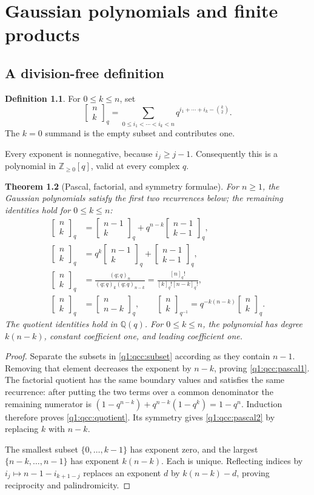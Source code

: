 \documentclass[11pt,a4paper,oneside,openany]{book}
\newtheorem{theorem}{Theorem}[chapter]
\theoremstyle{definition}
\newtheorem{definition}[theorem]{Definition}
\theoremstyle{remark}
\newcommand{\Z}{\mathbb Z}
\newcommand{\Q}{\mathbb Q}
\newcommand{\GB}[3][q]{\begin{bmatrix}#2\\#3\end{bmatrix}_{#1}}
\newcommand{\qf}[2][q]{[#2]_{#1}!}
\begin{document}
\chapter{Gaussian polynomials and finite products}
\label{q1:qcc:gaussian}
\section{A division-free definition}
\begin{definition}
For \(0\le k\le n\), set
\begin{equation}\label{q1:qcc:subset}
 \GB nk=\sum_{0\le i_1<\cdots<i_k<n}
 q^{i_1+\cdots+i_k-\binom{k}{2}}.
\end{equation}
The \(k=0\) summand is the empty subset and contributes one.
\end{definition}
Every exponent is nonnegative, because \(i_j\ge j-1\). Consequently this is a
polynomial in \(\Z_{\ge0}[q]\), valid at every complex \(q\).

\begin{theorem}[Pascal, factorial, and symmetry formulae]\label{q1:qcc:pascal}
For \(n\ge1\), the Gaussian polynomials satisfy the first two recurrences
below; the remaining identities hold for \(0\le k\le n\):
\begin{align}
 \GB nk&=\GB{n-1}k+q^{n-k}\GB{n-1}{k-1},\label{q1:qcc:pascal1}\\
 \GB nk&=q^k\GB{n-1}k+\GB{n-1}{k-1},\label{q1:qcc:pascal2}\\
 \GB nk&=\frac{(q;q)_n}{(q;q)_k(q;q)_{n-k}}
       =\frac{\qf n}{\qf k\qf{n-k}},\label{q1:qcc:quotient}\\
 \GB nk&=\GB n{n-k},\qquad
 \GB[q^{-1}]nk=q^{-k(n-k)}\GB nk.\label{q1:qcc:reciprocity}
\end{align}
The quotient identities hold in \(\Q(q)\). For \(0\le k\le n\), the polynomial
has degree \(k(n-k)\), constant coefficient one, and leading coefficient one.
\end{theorem}
\begin{proof}
Separate the subsets in \eqref{q1:qcc:subset} according as they contain \(n-1\).
Removing that element decreases the exponent by \(n-k\), proving
\eqref{q1:qcc:pascal1}. The factorial quotient has the same boundary values and
satisfies the same recurrence: after putting the two terms over a common
denominator the remaining numerator is
\((1-q^{n-k})+q^{n-k}(1-q^k)=1-q^n\).
Induction therefore proves \eqref{q1:qcc:quotient}. Its symmetry gives
\eqref{q1:qcc:pascal2} by replacing \(k\) with \(n-k\).

The smallest subset \(\{0,\ldots,k-1\}\) has exponent zero, and the largest
\(\{n-k,\ldots,n-1\}\) has exponent \(k(n-k)\). Each is unique.
Reflecting indices by \(i_j\mapsto n-1-i_{k+1-j}\) replaces an exponent \(d\)
by \(k(n-k)-d\), proving reciprocity and palindromicity.
\end{proof}
\end{document}
